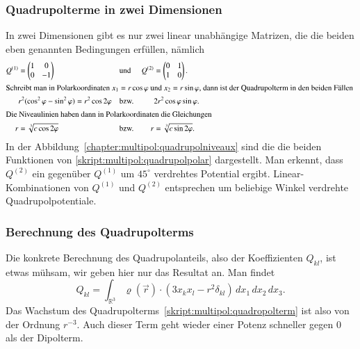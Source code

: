 \subsubsection{Quadrupolterme in zwei Dimensionen}
In zwei Dimensionen gibt es nur zwei linear unabhängige Matrizen, die die
beiden eben genannten Bedingungen erfüllen, nämlich
\begin{align}
Q^{(1)}&=\begin{pmatrix}1&0\\0&-1\end{pmatrix}
&&\text{und}&
Q^{(2)}&=\begin{pmatrix}0&1\\1&0\end{pmatrix}.
\label{skript:multipol:qmatrix}
\\
\intertext{%
Schreibt man in Polarkoordinaten $x_1=r\cos\varphi$ und $x_2=r\sin\varphi$,
dann ist der Quadrupolterm in den beiden Fällen
}
&r^2(\cos^2\varphi-\sin^2\varphi)=r^2\cos 2\varphi
&&\text{bzw.}&
&2r^2\cos\varphi\sin\varphi.
\notag
\\
\intertext{%
Die Niveaulinien haben dann in Polarkoordinaten die Gleichungen
}
r&=\sqrt[3]{c \cos2\varphi}
&&\text{bzw.}&
r&=\sqrt[3]{c \sin2\varphi}.
\label{skript:multipol:quadrupolpolar}
\end{align}
In der Abbildung~\ref{chapter:multipol:quadrupolniveaux} sind die die
beiden Funktionen von
\eqref{skript:multipol:quadrupolpolar} dargestellt.
Man erkennt, dass $Q^{(2)}$ ein gegenüber $Q^{(1)}$ um $45^\circ$ verdrehtes
Potential ergibt.
Linear-Kombinationen von $Q^{(1)}$ und $Q^{(2)}$ entsprechen um beliebige
Winkel verdrehte Quadrupolpotentiale.

\subsubsection{Berechnung des Quadrupolterms}
Die konkrete Berechnung des Quadrupolanteils, also der Koeffizienten
$Q_{kl}$, ist etwas mühsam, wir geben hier nur das Resultat an.
Man findet
\cite{skript:brandtdahmen}
\[
Q_{kl}
=
\int_{\mathbb R^3}
\varrho(\vec{r}) \cdot (3x_kx_l-r^2\delta_{kl})
\,dx_1\,dx_2\,dx_3.
\]
Das Wachstum des Quadrupolterms~\eqref{skript:multipol:quadropolterm}
ist also von der Ordnung $r^{-3}$.
Auch dieser Term geht wieder einer Potenz schneller gegen $0$ als der
Dipolterm.

